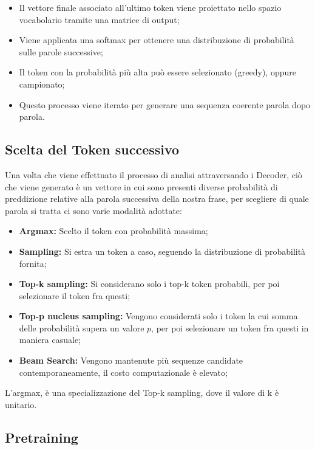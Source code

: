 \begin{itemize}
    \item Il vettore finale associato all’ultimo token viene proiettato nello spazio vocabolario tramite una matrice di output;
    \item Viene applicata una softmax per ottenere una distribuzione di probabilità sulle parole successive;
    \item Il token con la probabilità più alta può essere selezionato (greedy), oppure campionato;
    \item Questo processo viene iterato per generare una sequenza coerente parola dopo parola.
\end{itemize}

\subsection{Scelta del Token successivo}
Una volta che viene effettuato il processo di analisi attraversando i Decoder, ciò che viene generato è un vettore in cui sono presenti diverse probabilità di preddizione relative alla parola successiva della nostra frase, per scegliere di quale parola si tratta ci sono varie modalità adottate:

\begin{itemize}
    \item\textbf{Argmax:} Scelto il token con probabilità massima;
    \item\textbf{Sampling:} Si estra un token a caso, seguendo la distribuzione di probabilità fornita;
    \item\textbf{Top-k sampling:} Si considerano solo i top-k token probabili, per poi selezionare il token fra questi;
    \item\textbf{Top-p nucleus sampling:} Vengono considerati solo i token la cui somma delle probabilità supera un valore $p$, per poi selezionare un token fra questi in maniera casuale;
    \item\textbf{Beam Search:} Vengono mantenute più sequenze candidate contemporaneamente, il costo computazionale è elevato;
\end{itemize}

\begin{Osservazione}
    L'argmax, è una specializzazione del Top-k sampling, dove il valore di k è unitario.
\end{Osservazione}

\subsection{Pretraining}

